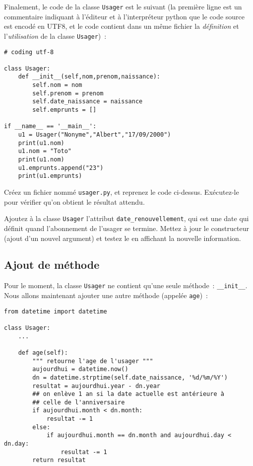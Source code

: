 \documentclass[10pt,a4paper]{sujets-exercices}
\begin{document}
Finalement, le code de la classe \verb!Usager! est le suivant (la première ligne est un commentaire indiquant à l'éditeur et à l'interpréteur python que le code source est encodé en UTF8, et le code contient dans un même fichier la \emph{définition} et l'\emph{utilisation} de la classe \verb!Usager!)~:

\begin{verbatim}
# coding utf-8

class Usager:
    def __init__(self,nom,prenom,naissance):
        self.nom = nom
        self.prenom = prenom
        self.date_naissance = naissance
        self.emprunts = []

if __name__ == '__main__':
    u1 = Usager("Nonyme","Albert","17/09/2000")
    print(u1.nom)
    u1.nom = "Toto"
    print(u1.nom)
    u1.emprunts.append("23")
    print(u1.emprunts)
\end{verbatim} 


\exercice{} Créez un fichier nommé \texttt{usager.py}, et reprenez le code ci-dessus. Exécutez-le pour vérifier qu'on obtient le résultat attendu.


\exercice{} Ajoutez à la classe \texttt{Usager} l'attribut \texttt{date\_renouvellement}, qui est une date qui définit quand l'abonnement de l'usager se termine. Mettez à jour le constructeur (ajout d'un nouvel argument) et testez le en affichant la nouvelle information.

\subsection*{Ajout de méthode}

Pour le moment, la classe \texttt{Usager} ne contient qu'une seule méthode~: \texttt{\_\_init\_\_}. Nous allons maintenant ajouter une autre méthode (appelée \verb!age!)~:

\begin{verbatim}
from datetime import datetime

class Usager:
    ...
    
    def age(self):
        """ retourne l'age de l'usager """
        aujourdhui = datetime.now()
        dn = datetime.strptime(self.date_naissance, '%d/%m/%Y')
        resultat = aujourdhui.year - dn.year
        ## on enlève 1 an si la date actuelle est antérieure à
        ## celle de l'anniversaire
        if aujourdhui.month < dn.month:
            resultat -= 1
        else:
            if aujourdhui.month == dn.month and aujourdhui.day < dn.day:
                resultat -= 1
        return resultat
\end{verbatim}
\end{document}
